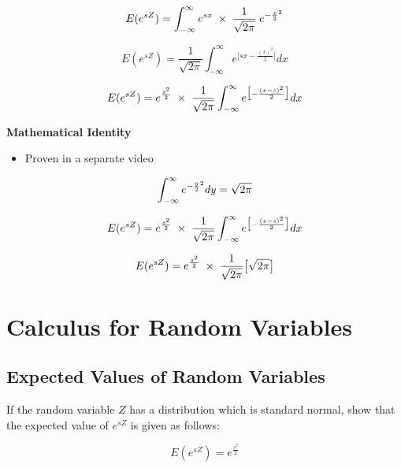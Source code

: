 \documentclass[00-IntroStatsMaster.tex]{subfiles}
\begin{document}
{
	
	\[ E( e^{sZ} ) =  \int_{-\infty}^{\infty}  e^{sx} \;\times\; \frac{1}{\sqrt{2\pi}} \;e^{ -{x \over 2}^2 }\]
	
	
	\[ E( e^{sZ} ) =  \frac{1}{\sqrt{2\pi}} \int_{-\infty}^{\infty}   e^{ \big[sx-\frac{(x)^2}{2} \big]} dx   \]
	
	\[ E( e^{sZ} ) =  e^{{s^2\over 2}} \; \times\; \frac{1}{\sqrt{2\pi}} \int_{-\infty}^{\infty} e^{ \big[-\frac{(x-s)^2}{2} \big]} dx   \]
}



\textbf{Mathematical Identity}
\begin{itemize}
	\item Proven in a separate video
\end{itemize}
{
	
	\[\int_{-\infty}^{\infty} e^{-{y\over 2}^2}dy  = \sqrt{2\pi}\]
	
}




{
	
	\[ E( e^{sZ} ) =  e^{{s^2\over 2}} \; \times\; \frac{1}{\sqrt{2\pi}} \int_{-\infty}^{\infty} e^{ \big[-\frac{(x-s)^2}{2} \big]} dx \]
	
	
	\[ E( e^{sZ} ) =  e^{{s^2\over 2}} \; \times\; \frac{1}{\sqrt{2\pi}} \big[\sqrt{2\pi} \big] \]
}



	\chapter{Calculus for Random Variables}
	
	\section{Expected Values of Random Variables}
	
	If the random variable $Z$ has a distribution which is standard normal, show that the expected value of $e^{sZ}$ is given as follows:
	
	\[E(e^{sZ})  =  e^{\frac{s^2}{2}}\] 
	
\end{document}
